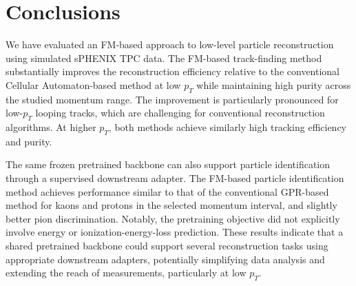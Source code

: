 \documentclass[aps,physrev,twocolumn,superscriptaddress]{revtex4-2}
\begin{document}
\section{Conclusions}
We have evaluated an FM-based approach to low-level particle reconstruction using simulated sPHENIX TPC data. The FM-based track-finding method substantially improves the reconstruction efficiency relative to the conventional Cellular Automaton-based method at low $p_T$ while maintaining high purity across the studied momentum range. The improvement is particularly pronounced for low-$p_T$ looping tracks, which are challenging for conventional reconstruction algorithms. At higher $p_T$, both methods achieve similarly high tracking efficiency and purity.

The same frozen pretrained backbone can also support particle identification through a supervised downstream adapter. The FM-based particle identification method achieves performance similar to that of the conventional GPR-based \dedx{} method for kaons and protons in the selected momentum interval, and slightly better pion discrimination. Notably, the pretraining objective did not explicitly involve energy or ionization-energy-loss prediction. These results indicate that a shared pretrained backbone could support several reconstruction tasks using appropriate downstream adapters, potentially simplifying data analysis and extending the reach of measurements, particularly at low $p_T$.
\end{document}
